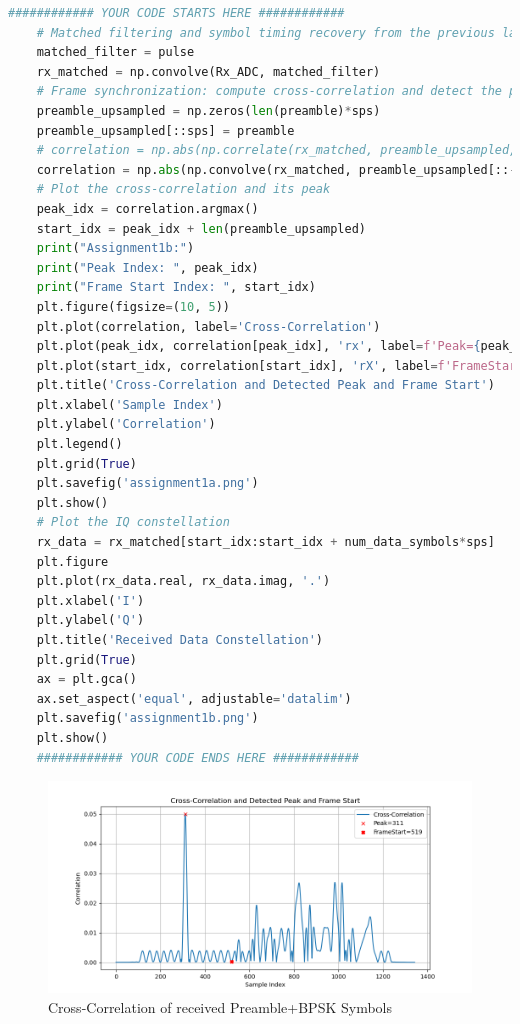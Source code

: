 \documentclass[
	letterpaper, %
	10pt, %
]{CSUniSchoolLabReport}
\begin{document}
\begin{lstlisting}[language=Python]
	############ YOUR CODE STARTS HERE ############
	# Matched filtering and symbol timing recovery from the previous labs here
	matched_filter = pulse
	rx_matched = np.convolve(Rx_ADC, matched_filter)
	# Frame synchronization: compute cross-correlation and detect the peak  
	preamble_upsampled = np.zeros(len(preamble)*sps)
	preamble_upsampled[::sps] = preamble
	# correlation = np.abs(np.correlate(rx_matched, preamble_upsampled, mode='valid')) / len(preamble_upsampled)
	correlation = np.abs(np.convolve(rx_matched, preamble_upsampled[::-1])) / len(preamble_upsampled)
	# Plot the cross-correlation and its peak
	peak_idx = correlation.argmax()
	start_idx = peak_idx + len(preamble_upsampled)
	print("Assignment1b:")
	print("Peak Index: ", peak_idx)
	print("Frame Start Index: ", start_idx)
	plt.figure(figsize=(10, 5))
	plt.plot(correlation, label='Cross-Correlation')
	plt.plot(peak_idx, correlation[peak_idx], 'rx', label=f'Peak={peak_idx}')
	plt.plot(start_idx, correlation[start_idx], 'rX', label=f'FrameStart={start_idx}')
	plt.title('Cross-Correlation and Detected Peak and Frame Start')
	plt.xlabel('Sample Index')
	plt.ylabel('Correlation')
	plt.legend()
	plt.grid(True)
	plt.savefig('assignment1a.png')
	plt.show()
	# Plot the IQ constellation
	rx_data = rx_matched[start_idx:start_idx + num_data_symbols*sps]
	plt.figure
	plt.plot(rx_data.real, rx_data.imag, '.')
	plt.xlabel('I')
	plt.ylabel('Q')
	plt.title('Received Data Constellation')
	plt.grid(True)
	ax = plt.gca()
	ax.set_aspect('equal', adjustable='datalim')
	plt.savefig('assignment1b.png')
	plt.show()
	############ YOUR CODE ENDS HERE ############
\end{lstlisting}

\begin{figure}[H] %
	\centering %
	\includegraphics[width=1.2\textwidth]{assignment1a.png} %
	\caption{Cross-Correlation of received Preamble+BPSK Symbols}
	\label{fig:block}
\end{figure}
\end{document}
